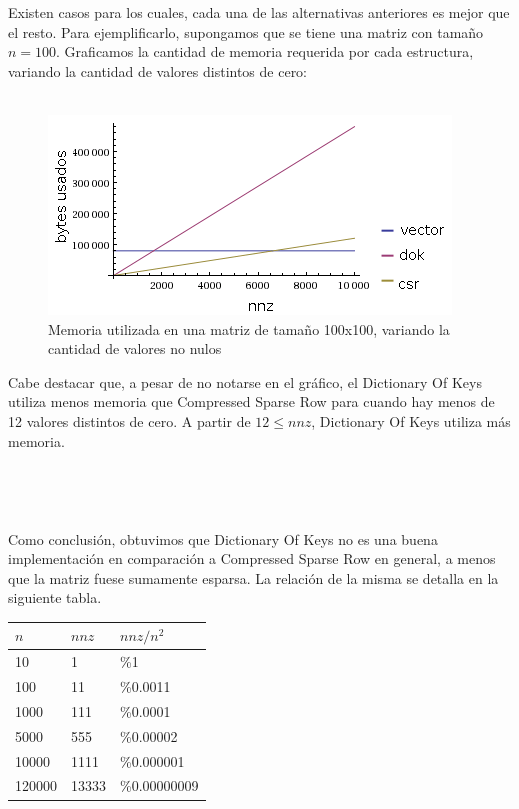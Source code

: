 Existen casos para los cuales, cada una de las alternativas anteriores es mejor que el resto. Para ejemplificarlo, supongamos que se tiene una matriz con tamaño $n=100$. Graficamos la cantidad de memoria requerida por cada estructura, variando la cantidad de valores distintos de cero: \\ \\

\begin{figure}
  \vspace{-20pt}
  \begin{center}
    \includegraphics[scale= 0.6]{imagenes/n100espacio.png}
  \end{center}
  \vspace{-20pt}
   \caption[Caption espacio n 100]{Memoria utilizada en una matriz de tamaño 100x100, variando la cantidad de valores no nulos}
  \vspace{-10pt}
  \label{fig:img1}
\end{figure}

Cabe destacar que, a pesar de no notarse en el gráfico, el Dictionary Of Keys utiliza menos memoria que Compressed Sparse Row para cuando hay menos de 12 valores distintos de cero. A partir de $12 \leq nnz$, Dictionary Of Keys utiliza más memoria. \\ \\ \\ \\  \\
Como conclusión, obtuvimos que Dictionary Of Keys no es una buena implementación en comparación a Compressed Sparse Row en general, a menos que la matriz fuese sumamente esparsa. La relación de la misma se detalla en la siguiente tabla.

\begin{center}
    \begin{tabular}{| l | l | l |}
    \hline
    $n$ & $nnz$ & $nnz/n^2$  \\ \hline
    10	& 1	& \%1 \\ \hline
	100	& 11	& \%0.0011 \\ \hline
	1000 & 111	& \%0.0001 \\ \hline
	5000 & 555 & \%0.00002 \\ \hline
	10000 & 1111 & \%0.000001 \\ \hline
	120000 & 13333 & \%0.00000009 \\ \hline
    \end{tabular}
\end{center}

